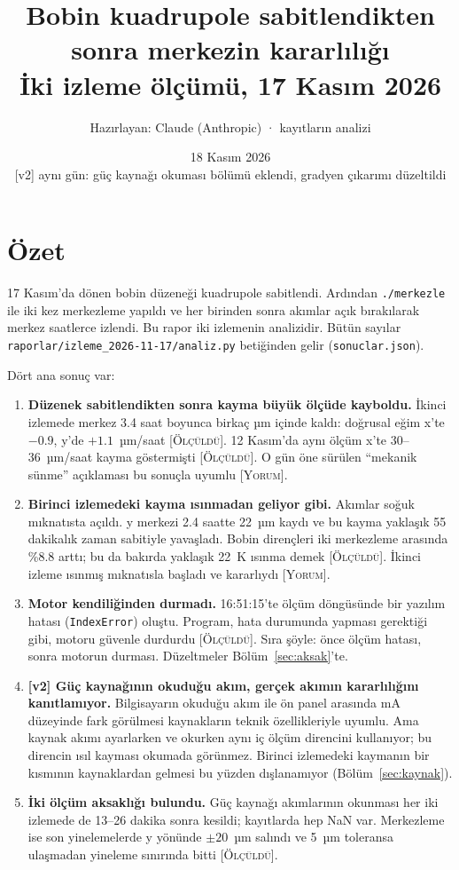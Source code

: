 \documentclass[11pt,a4paper]{article}
\title{Bobin kuadrupole sabitlendikten sonra merkezin kararlılığı\\[0.3em]
\large İki izleme ölçümü, 17 Kasım 2026}
\author{Hazırlayan: Claude (Anthropic) · kayıtların analizi}
\date{18 Kasım 2026 \\ \small [v2] aynı gün: güç kaynağı okuması bölümü eklendi, gradyen çıkarımı düzeltildi}
\newcommand{\kod}[1]{\texttt{#1}}
\newcommand{\olc}{\textsc{[Ölçüldü]}}
\newcommand{\yor}{\textsc{[Yorum]}}
\begin{document}
\maketitle

\section*{Özet}

17 Kasım'da dönen bobin düzeneği kuadrupole sabitlendi. Ardından \kod{./merkezle} ile iki kez merkezleme
yapıldı ve her birinden sonra akımlar açık bırakılarak merkez saatlerce izlendi. Bu rapor iki izlemenin
analizidir. Bütün sayılar \kod{raporlar/izleme\_2026-11-17/analiz.py} betiğinden gelir
(\kod{sonuclar.json}).

Dört ana sonuç var:
\begin{enumerate}
\item \textbf{Düzenek sabitlendikten sonra kayma büyük ölçüde kayboldu.} İkinci izlemede merkez
3.4 saat boyunca birkaç µm içinde kaldı: doğrusal eğim x'te $-0.9$, y'de $+1.1$~µm/saat \olc.
12 Kasım'da aynı ölçüm x'te 30--36~µm/saat kayma göstermişti \olc. O gün öne sürülen ``mekanik
sünme'' açıklaması bu sonuçla uyumlu \yor.
\item \textbf{Birinci izlemedeki kayma ısınmadan geliyor gibi.} Akımlar soğuk mıknatısta açıldı. y merkezi
2.4 saatte 22~µm kaydı ve bu kayma yaklaşık 55 dakikalık zaman sabitiyle yavaşladı. Bobin dirençleri iki
merkezleme arasında \%8.8 arttı; bu da bakırda yaklaşık 22~K ısınma demek \olc. İkinci izleme ısınmış
mıknatısla başladı ve kararlıydı \yor.
\item \textbf{Motor kendiliğinden durmadı.} 16:51:15'te ölçüm döngüsünde bir yazılım hatası
(\kod{IndexError}) oluştu. Program, hata durumunda yapması gerektiği gibi, motoru güvenle durdurdu
\olc. Sıra şöyle: önce ölçüm hatası, sonra motorun durması. Düzeltmeler Bölüm~\ref{sec:aksak}'te.
\item \textbf{[v2] Güç kaynağının okuduğu akım, gerçek akımın kararlılığını kanıtlamıyor.} Bilgisayarın
okuduğu akım ile ön panel arasında mA düzeyinde fark görülmesi kaynakların teknik özellikleriyle uyumlu.
Ama kaynak akımı ayarlarken ve okurken aynı iç ölçüm direncini kullanıyor; bu direncin ısıl kayması
okumada görünmez. Birinci izlemedeki kaymanın bir kısmının kaynaklardan gelmesi bu yüzden dışlanamıyor
(Bölüm~\ref{sec:kaynak}).
\item \textbf{İki ölçüm aksaklığı bulundu.} Güç kaynağı akımlarının okunması her iki izlemede de 13--26
dakika sonra kesildi; kayıtlarda hep NaN var. Merkezleme ise son yinelemelerde y yönünde $\pm 20$~µm
salındı ve 5~µm toleransa ulaşmadan yineleme sınırında bitti \olc.
\end{enumerate}
\end{document}
